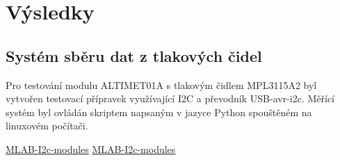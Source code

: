 \documentclass[12pt,a4paper,oneside]{article}
\begin{document}
\section{Výsledky}

\subsection{Systém sběru dat z tlakových čidel}

Pro testování modulu ALTIMET01A s tlakovým čidlem MPL3115A2 byl vytvořen testovací přípravek využívající I2C a převodník USB-avr-i2c. Měřící systém byl ovládán skriptem napsaným v jazyce Python spouštěném na linuxovém počítači.  

\begin{thebibliography}{99}
\href{https://github.com/MLAB-project/MLAB-I2c-modules}{MLAB-I2c-modules}
\href{svn://svn.mlab.cz/mlab/Modules/Sensors/ALTIMET01A/SW/Python}{MLAB-I2c-modules}
\end{thebibliography}
\end{document}
